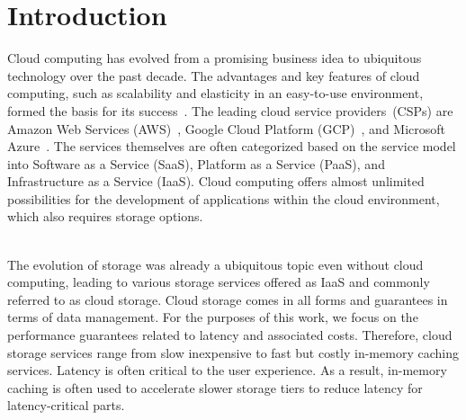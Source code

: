 \chapter{Introduction}
\label{cha:introduction}


Cloud computing has evolved from a promising business idea to ubiquitous technology over the past decade. The advantages and key features of cloud computing, such as scalability and elasticity in an easy-to-use environment, formed the basis for its success~\cite{saraswat_cloud_2020}. The leading cloud service providers~(CSPs) are Amazon Web Services (AWS)~\cite{noauthor_cloud_nodate-4}, Google Cloud Platform (GCP)~\cite{noauthor_cloud_nodate-3}, and Microsoft Azure~\cite{noauthor_cloud_nodate-2}. The services themselves are often categorized based on the service model into Software as a Service (SaaS), Platform as a Service (PaaS), and Infrastructure as a Service (IaaS). Cloud computing offers almost unlimited possibilities for the development of applications within the cloud environment, which also requires storage options. 

~\\
The evolution of storage was already a ubiquitous topic even without cloud computing, leading to various storage services offered as IaaS and commonly referred to as cloud storage. Cloud storage comes in all forms and guarantees in terms of data management. For the purposes of this work, we focus on the performance guarantees related to latency and associated costs. Therefore, cloud storage services range from slow inexpensive to fast but costly in-memory caching services. Latency is often critical to the user experience. As a result, in-memory caching is often used to accelerate slower storage tiers to reduce latency for latency-critical parts. 

